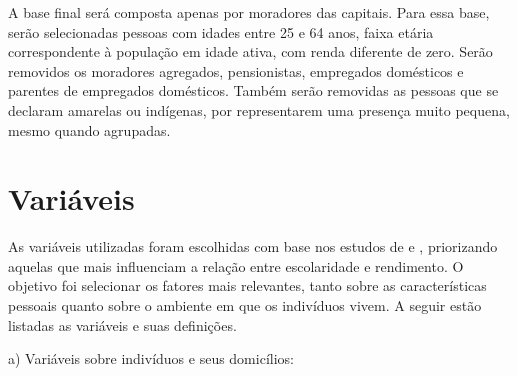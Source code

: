 \documentclass[12pt,a4paper,header]{abnt}
\begin{document}
A base final será composta apenas por moradores das capitais. Para essa base, serão selecionadas pessoas com idades entre 25 e 64 anos, faixa etária correspondente à população em idade ativa, com renda diferente de zero. Serão removidos os moradores agregados, pensionistas, empregados domésticos e parentes de empregados domésticos. Também serão removidas as pessoas que se declaram amarelas ou indígenas, por representarem uma presença muito pequena, mesmo quando agrupadas.


\section{Variáveis}
As variáveis utilizadas foram escolhidas com base nos estudos de  e , priorizando aquelas que mais influenciam a relação entre escolaridade e rendimento. O objetivo foi selecionar os fatores mais relevantes, tanto sobre as características pessoais quanto sobre o ambiente em que os indivíduos vivem. A seguir estão listadas as variáveis e suas definições.

\vspace{1em}
\noindent a) Variáveis sobre indivíduos e seus domicílios:
\end{document}
